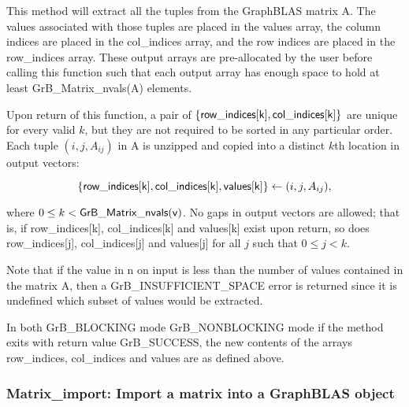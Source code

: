 This method will extract all the tuples from the GraphBLAS matrix {\sf A}.  
The values associated with those tuples are placed in the
{\sf values} array, the column indices are placed in the {\sf col\_indices} array, 
and the row indices are placed in the {\sf row\_indices} array. 
These output arrays are pre-allocated by the user before calling
this function such that each output array has enough
space to hold at least {\sf GrB\_Matrix\_nvals(A)} elements. 

Upon return of this function, a pair of $\{{\sf row\_indices[k], col\_indices[k]}\}$ are unique for every valid $k$, 
but they are not required to be sorted in any particular order.
Each tuple $(i,j,A_{ij})$ in {\sf A} is unzipped and copied into a distinct $k$th location in output vectors:  

$$\{{\sf row\_indices[k]}, {\sf col\_indices[k]}, {\sf values[k]}\} \leftarrow (i,j,A_{ij}),$$

where $0 \leq k < {\sf GrB\_Matrix\_nvals(v)}$. 
No gaps in output vectors are allowed; that is, if {\sf row\_indices[k]},  {\sf col\_indices[k]}  and {\sf values[k]} exist upon return, 
so does {\sf row\_indices[j]}, {\sf col\_indices[j]} and {\sf values[j]} for all $j$ such that $0 \leq j < k$.

Note that if the value in {\sf n} on input is less than the number of values
contained in the matrix {\sf A}, then a {\sf GrB\_INSUFFICIENT\_SPACE} error 
is returned since it is undefined which subset of values would
be extracted.

In both {\sf GrB\_BLOCKING} mode {\sf GrB\_NONBLOCKING} mode
if the method exits with return value {\sf GrB\_SUCCESS}, the  new 
contents of the arrays {\sf row\_indices}, {\sf col\_indices} and {\sf values} are as defined above.  




\subsubsection{{\sf Matrix\_import}: Import a matrix into a GraphBLAS object }
\label{Sec:Matrix_import}

\paragraph{\syntax}


